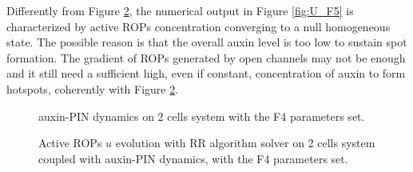 Differently from Figure \ref{fig:U_F4}, the numerical output in Figure \ref{fig:U_F5} is characterized by active ROPs concentration converging to a null homogeneous state. The possible reason is that the overall auxin level is too low to sustain spot formation. The gradient of ROPs generated by open channels may not be enough and it still need a sufficient high, even if constant, concentration of auxin to form hotspots, coherently with Figure \ref{fig:U_F4}.
\begin{figure}[H]
    \centering
    \quad
    \caption[auxin-PIN - with the F4 set]{auxin-PIN dynamics on 2 cells system with the F4 parameters set.}
    \label{fig:Uaux_F4}
\end{figure}
\begin{figure}[H]
    \centering
    \quad
    \quad
    \quad
    \quad
    \quad
    \quad
    \caption[2cell RR Active ROPs coupled auxin-PIN - with the F5 prm]{Active ROPs $u$ evolution with RR algorithm solver on 2 cells system coupled with auxin-PIN dynamics, with the F4 parameters set.}
    \label{fig:U_F4}
\end{figure}

